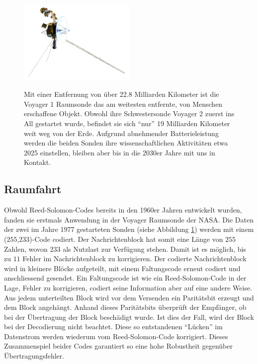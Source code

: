 \begin{figure}
	\centering
	\includegraphics[width=0.5\textwidth]{papers/reedsolomon/images/Voyager_Sonde}
	\caption{Mit einer Entfernung von über 22.8 Milliarden Kilometer ist die Voyager 1 Raumsonde das am weitesten entfernte, von Menschen erschaffene Objekt. Obwohl ihre Schwestersonde Voyager 2 zuerst ins All gestartet wurde, befindet sie sich ``nur'' 19 Milliarden Kilometer weit weg von der Erde. Aufgrund abnehmender Batterieleistung werden die beiden Sonden ihre wissenschaftlichen Aktivitäten etwa 2025 einstellen, bleiben aber bis in die 2030er Jahre mit uns in Kontakt.}
%
	\label{fig:voyager}
\end{figure}

\subsection{Raumfahrt}
Obwohl Reed-Solomon-Codes bereits in den 1960er Jahren entwickelt wurden, fanden sie erstmals Anwendung in der Voyager Raumsonde der NASA. Die Daten der zwei im Jahre 1977 gestarteten Sonden (siehe Abbildung \ref{fig:voyager}) werden mit einem ($255$,$233$)-Code
%
%
codiert. 
Der Nachrichtenblock hat somit eine Länge von $255$ Zahlen, wovon $233$ als Nutzlast zur Verfügung stehen.
Damit ist es möglich, bis zu $11$ Fehler im Nachrichtenblock zu korrigieren. 
Der codierte Nachrichtenblock wird in kleinere Blöcke aufgeteilt, mit einem Faltungscode erneut codiert und anschliessend gesendet.
Ein Faltungscode ist wie ein Reed-Solomon-Code in der Lage, Fehler zu korrigieren, 
codiert seine Information aber auf eine andere Weise. Aus jedem unterteilten Block wird vor dem Versenden ein Paritätsbit erzeugt und dem Block angehängt. Anhand dieses Paritätsbits überprüft der Empfänger, ob bei der Übertragung der Block beschädigt wurde. Ist dies der Fall, wird der Block bei der Decodierung nicht beachtet. Diese so entstandenen ``Lücken'' im Datenstrom werden wiederum vom Reed-Solomon-Code korrigiert. Dieses Zusammenspiel beider Codes garantiert so eine hohe Robustheit gegenüber Übertragungsfehler. 


